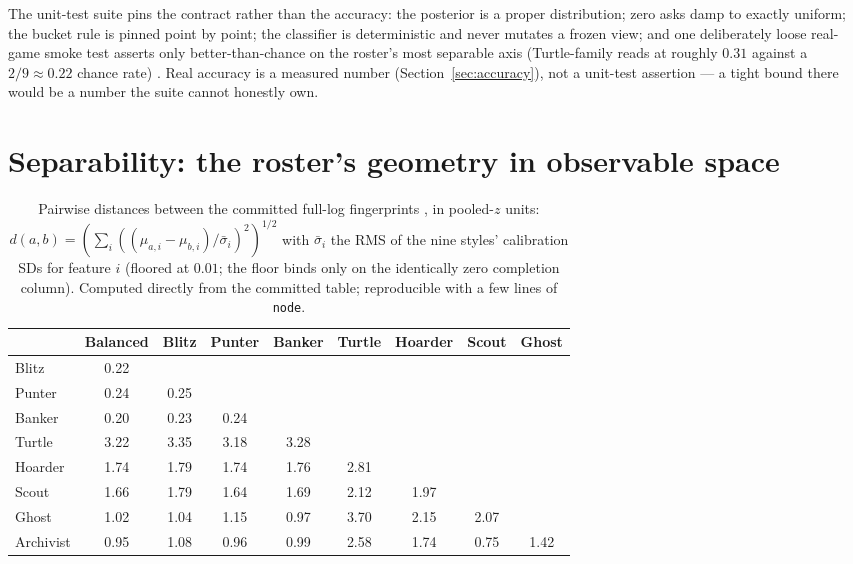 \documentclass[11pt]{article}
\newcommand{\code}[1]{\texttt{#1}}
\begin{document}
The unit-test suite pins the contract rather than the accuracy: the posterior is a proper
distribution; zero asks damp to exactly uniform; the bucket rule is pinned point by point;
the classifier is deterministic and never mutates a frozen view; and one deliberately loose
real-game smoke test asserts only better-than-chance on the roster's most separable axis
(Turtle-family reads at roughly $0.31$ against a $2/9 \approx 0.22$ chance rate)
\cite{repo}. Real accuracy is a measured number (Section~\ref{sec:accuracy}), not a unit-test
assertion --- a tight bound there would be a number the suite cannot honestly own.

\section{Separability: the roster's geometry in observable space}
\label{sec:separability}

\begin{table}[t]
\centering
\caption{Pairwise distances between the committed full-log fingerprints
\cite{fingerprints}, in pooled-$z$ units: $d(a,b) = (\sum_i ((\mu_{a,i} -
\mu_{b,i})/\bar\sigma_i)^2)^{1/2}$ with $\bar\sigma_i$ the RMS of the nine styles'
calibration SDs for feature $i$ (floored at $0.01$; the floor binds only on the identically
zero completion column). Computed directly from the committed table; reproducible with a
few lines of \code{node}.}
\label{tab:dist}
\footnotesize
\begin{tabular}{@{}lcccccccc@{}}
\toprule
 & Balanced & Blitz & Punter & Banker & Turtle & Hoarder & Scout & Ghost \\
\midrule
Blitz     & 0.22 &      &      &      &      &      &      &      \\
Punter    & 0.24 & 0.25 &      &      &      &      &      &      \\
Banker    & 0.20 & 0.23 & 0.24 &      &      &      &      &      \\
Turtle    & 3.22 & 3.35 & 3.18 & 3.28 &      &      &      &      \\
Hoarder   & 1.74 & 1.79 & 1.74 & 1.76 & 2.81 &      &      &      \\
Scout     & 1.66 & 1.79 & 1.64 & 1.69 & 2.12 & 1.97 &      &      \\
Ghost     & 1.02 & 1.04 & 1.15 & 0.97 & 3.70 & 2.15 & 2.07 &      \\
Archivist & 0.95 & 1.08 & 0.96 & 0.99 & 2.58 & 1.74 & 0.75 & 1.42 \\
\bottomrule
\end{tabular}
\end{table}
\end{document}
